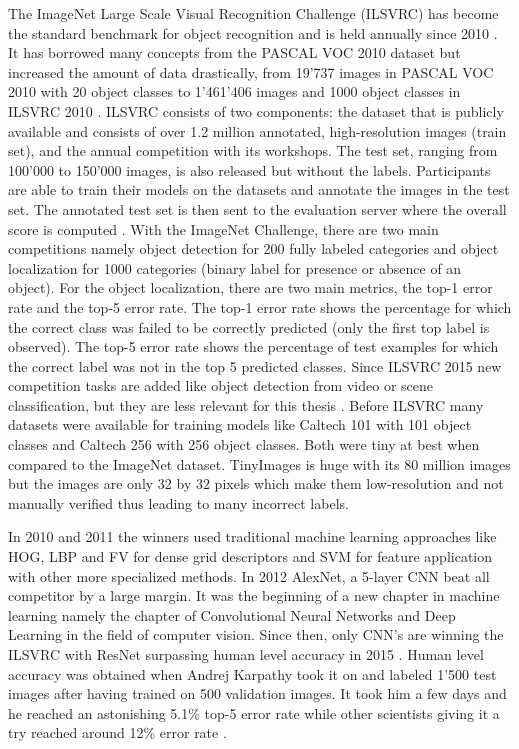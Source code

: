 The ImageNet Large Scale Visual Recognition Challenge (ILSVRC) has become the standard benchmark for object recognition and is held annually since 2010 \cite{imagenet}. It has borrowed many concepts from the PASCAL VOC 2010 dataset but increased the amount of data drastically, from 19'737 images in PASCAL VOC 2010 with 20 object classes to 1'461'406 images and 1000 object classes in ILSVRC 2010 \cite{everingham2010pascal, russakovsky2015imagenet}. ILSVRC consists of two components: the dataset that is publicly available and consists of over 1.2 million annotated, high-resolution images (train set), and the annual competition with its workshops. The test set, ranging from 100'000 to 150'000 images, is also released but without the labels. Participants are able to train their models on the datasets and annotate the images in the test set. The annotated test set is then sent to the evaluation server where the overall score is computed \cite{russakovsky2015imagenet}. With the ImageNet Challenge, there are two main competitions namely object detection for 200 fully labeled categories and object localization for 1000 categories (binary label for presence or absence of an object). For the object localization, there are two main metrics, the top-1 error rate and the top-5 error rate. The top-1 error rate shows the percentage for which the correct class was failed to be correctly predicted (only the first top label is observed). The top-5 error rate shows the percentage of test examples for which the correct label was not in the top 5 predicted classes. Since ILSVRC 2015 new competition tasks are added like object detection from video or scene classification, but they are less relevant for this thesis \cite{imagenet2015}. Before ILSVRC many datasets were available for training models like Caltech 101 \cite{fei2007learning} with 101 object classes and Caltech 256 \cite{griffin2007caltech} with 256 object classes. Both were tiny at best when compared to the ImageNet dataset. TinyImages \cite{torralba200880} is huge with its 80 million images but the images are only 32 by 32 pixels which make them low-resolution and not manually verified thus leading to many incorrect labels.

In 2010 and 2011 the winners used traditional machine learning approaches like HOG, LBP and FV for dense grid descriptors and SVM for feature application with other more specialized methods. In 2012 AlexNet, a 5-layer CNN beat all competitor by a large margin. It was the beginning of a new chapter in machine learning namely the chapter of Convolutional Neural Networks and Deep Learning in the field of computer vision. Since then, only CNN's are winning the ILSVRC with ResNet surpassing human level accuracy in 2015 \cite{he2016deep}. Human level accuracy was obtained when Andrej Karpathy took it on and labeled 1'500 test images after having trained on 500 validation images. It took him a few days and he reached an astonishing 5.1\% top-5 error rate while other scientists giving it a try reached around 12\% error rate \cite{humanlevel2014}.

